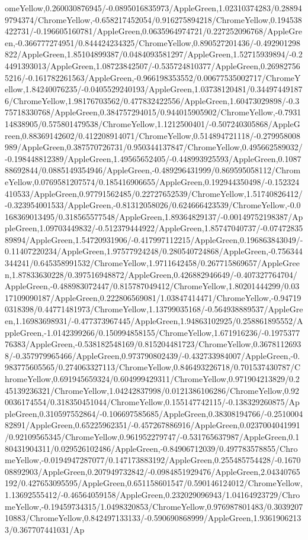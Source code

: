 {\begin{tikzternal}
omeYellow,0.260030876945/-0.0895016835973/AppleGreen,1.02310374283/0.288949794374/ChromeYellow,-0.658217452054/0.916275894218/ChromeYellow,0.194538422731/-0.196605160781/AppleGreen,0.0635964974721/0.227252096768/AppleGreen,-0.366777274951/0.844424234325/ChromeYellow,0.890527201436/-0.492901298822/AppleGreen,1.85104899387/0.0484093581297/AppleGreen,1.52715939894/-0.24491393013/AppleGreen,1.08723842507/-0.535724810377/AppleGreen,0.269827565216/-0.161782261563/AppleGreen,-0.966198353552/0.00677535002717/ChromeYellow,1.84240076235/-0.0405529240193/AppleGreen,1.03738120481/0.344974491876/ChromeYellow,1.98176703562/0.477832422556/AppleGreen,1.60473029898/-0.375718330768/AppleGreen,0.384757294015/0.944015905902/ChromeYellow,-0.793114838905/0.575801479538/ChromeYellow,1.1212500401/-0.507240305868/AppleGreen,0.88369142602/0.412208914071/ChromeYellow,0.514894721118/-0.279958008989/AppleGreen,0.387570726731/0.950344137847/ChromeYellow,0.495662589032/-0.198448812389/AppleGreen,1.49565652405/-0.448993925593/AppleGreen,0.108788692844/0.0885149354946/AppleGreen,-0.489296431999/0.869595058112/ChromeYellow,0.0769581207574/0.185416906655/AppleGreen,0.192944350498/-0.152324410533/AppleGreen,0.97791562485/0.22727652539/ChromeYellow,1.51740826412/-0.323954001533/AppleGreen,-0.81312058026/0.624666423539/ChromeYellow,-0.0168369013495/0.318565577548/AppleGreen,1.89364829137/-0.00149752198387/AppleGreen,1.09703449832/-0.512379444922/AppleGreen,1.85747040737/-0.0747283589894/AppleGreen,1.54720931906/-0.417997112215/AppleGreen,0.196863843049/-0.11407220234/AppleGreen,1.97577924248/0.280540724868/AppleGreen,-0.756344344241/0.645358991532/ChromeYellow,1.9711642458/0.267715869657/AppleGreen,1.87833630228/0.397516948872/AppleGreen,0.426882946649/-0.407327764704/AppleGreen,-0.488983072447/0.815787049412/ChromeYellow,1.80201444299/0.0317109090187/AppleGreen,0.222806569081/1.03847414471/ChromeYellow,-0.947190318398/0.44771481973/ChromeYellow,1.13799035168/-0.564938889537/AppleGreen,1.16983698931/-0.477373967445/AppleGreen,1.94863102925/0.258861895552/AppleGreen,-1.0142399266/0.150994858155/ChromeYellow,1.671916236/-0.197537776383/AppleGreen,-0.538182548169/0.815204481723/ChromeYellow,0.36781126938/-0.357979965466/AppleGreen,0.973790802439/-0.432733984007/AppleGreen,-0.983775605565/0.274063327113/ChromeYellow,0.846493226718/0.701537430787/ChromeYellow,0.691945659324/0.604999429311/ChromeYellow,0.971904213829/0.245139236321/ChromeYellow,1.04242837998/0.0121386106286/ChromeYellow,0.920036174554/0.318350451044/ChromeYellow,0.155147742115/-0.138329260875/AppleGreen,0.310597552864/-0.106697585685/AppleGreen,0.38308194766/-0.251000482891/AppleGreen,0.65225962351/-0.457267886916/AppleGreen,0.0237004041991/0.92109565345/ChromeYellow,0.961952279747/-0.531765637987/AppleGreen,0.180431904311/0.029526102486/AppleGreen,-0.84906712039/0.497783578855/ChromeYellow,-0.0194947287077/0.147173883192/AppleGreen,0.255485754428/-0.167008892903/AppleGreen,0.207949732842/-0.0984851929476/AppleGreen,2.04340765192/0.427653095595/AppleGreen,0.651158601547/0.590146124012/ChromeYellow,1.13692555412/-0.46564059158/AppleGreen,0.232029096943/1.04164923729/ChromeYellow,-0.19459734315/1.0498320853/ChromeYellow,0.976987801483/0.303920710883/ChromeYellow,0.842497133133/-0.590690868999/AppleGreen,1.93619062133/0.367707441031/Ap
\end{tikzternal}}
